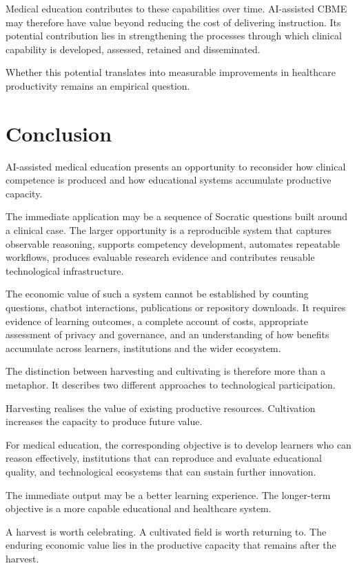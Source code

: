 \documentclass[11pt,a4paper]{article}
\begin{document}
Medical education contributes to these capabilities over time. AI-assisted CBME may therefore have value beyond reducing the cost of delivering instruction. Its potential contribution lies in strengthening the processes through which clinical capability is developed, assessed, retained and disseminated.

Whether this potential translates into measurable improvements in healthcare productivity remains an empirical question.

\section{Conclusion}
AI-assisted medical education presents an opportunity to reconsider how clinical competence is produced and how educational systems accumulate productive capacity.

The immediate application may be a sequence of Socratic questions built around a clinical case. The larger opportunity is a reproducible system that captures observable reasoning, supports competency development, automates repeatable workflows, produces evaluable research evidence and contributes reusable technological infrastructure.

The economic value of such a system cannot be established by counting questions, chatbot interactions, publications or repository downloads. It requires evidence of learning outcomes, a complete account of costs, appropriate assessment of privacy and governance, and an understanding of how benefits accumulate across learners, institutions and the wider ecosystem.

The distinction between harvesting and cultivating is therefore more than a metaphor. It describes two different approaches to technological participation.

Harvesting realises the value of existing productive resources. Cultivation increases the capacity to produce future value.

For medical education, the corresponding objective is to develop learners who can reason effectively, institutions that can reproduce and evaluate educational quality, and technological ecosystems that can sustain further innovation.

The immediate output may be a better learning experience. The longer-term objective is a more capable educational and healthcare system.

A harvest is worth celebrating. A cultivated field is worth returning to. The enduring economic value lies in the productive capacity that remains after the harvest.
\end{document}
